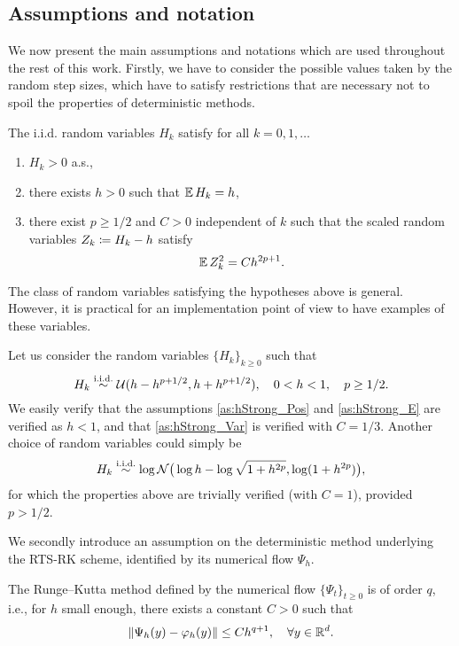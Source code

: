 \documentclass[10pt]{article}
\begin{document}
\subsection{Assumptions and notation} We now present the main assumptions and notations which are used throughout the rest of this work. Firstly, we have to consider the possible values taken by the random step sizes, which have to satisfy restrictions that are necessary not to spoil the properties of deterministic methods. 
\begin{assumption}\label{as:hStrong} The i.i.d. random variables $H_k$ satisfy for all $k = 0, 1, \ldots$
	\begin{enumerate}
		\item\label{as:hStrong_Pos} $H_k > 0$ a.s.,
		\item\label{as:hStrong_E} there exists $h > 0$ such that $\operatorname{\mathbb{E}} H_k = h$,
		\item\label{as:hStrong_Var} there exist $p \geq 1/2$ and $C > 0$ independent of $k$ such that the scaled random variables $Z_k \coloneqq H_k - h$ satisfy
		\begin{equation}
			\operatorname{\mathbb{E}} Z_k^2 = Ch^{2p+1}.
		\end{equation}
	\end{enumerate}
\end{assumption}
The class of random variables satisfying the hypotheses above is general. However, it is practical for an implementation point of view to have examples of these variables.
\begin{example}\label{ex:uniformH} Let us consider the random variables $\{H_k\}_{k\geq 0}$ such that
	\begin{equation}
	H_k \stackrel{\text{i.i.d.}}{\sim} \mathcal{U}(h-h^{p+1/2}, h+h^{p+1/2}), \quad 0 < h < 1, \quad p \geq 1/2.
	\end{equation}
	We easily verify that the assumptions \ref{as:hStrong_Pos} and \ref{as:hStrong_E} are verified as $h < 1$, and that \ref{as:hStrong_Var} is verified with $C = 1/3$. Another choice of random variables could simply be 
	\begin{equation}\label{eq:logNormalH}
	H_k \stackrel{\text{i.i.d.}}{\sim} \log\mathcal{N}\big(\log h - \log\sqrt{1 + h^{2p}}, \log(1 + h^{2p})\big),
	\end{equation}
	for which the properties above are trivially verified (with $C = 1$), provided $p > 1/2$.
\end{example}
We secondly introduce an assumption on the deterministic  method underlying the RTS-RK scheme, identified by its numerical flow $\Psi_h$. 
\begin{assumption}\label{as:PsiStrong} The Runge--Kutta method defined by the numerical flow $\{\Psi_t\}_{t\geq 0}$ is of order $q$, i.e., for $h$ small enough, there exists a constant $C > 0$ such that
		\begin{equation}
		\lVert\Psi_h(y) - \varphi_h(y)\rVert \leq Ch^{q+1}, \quad \forall y \in \mathbb{R}^d.
		\end{equation}
\end{assumption}
\end{document}
